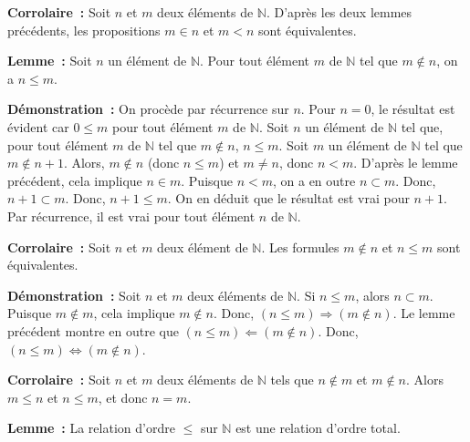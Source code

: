    \done 

\medskip

\noindent\textbf{Corrolaire :} 
    Soit $n$ et $m$ deux éléments de $\mathbb{N}$. 
    D'après les deux lemmes précédents, les propositions $m \in n$ et $m < n$ sont équivalentes.

\medskip

\noindent\textbf{Lemme :} 
    Soit $n$ un élément de $\mathbb{N}$. 
    Pour tout élément $m$ de $\mathbb{N}$ tel que $m \notin n$, on a $n \leq m$.

\medskip

\noindent\textbf{Démonstration :} 
    On procède par récurrence sur $n$. 
    Pour $n=0$, le résultat est évident car $0 \leq m$ pour tout élément $m$ de $\mathbb{N}$.
    Soit $n$ un élément de $\mathbb{N}$ tel que, pour tout élément $m$ de $\mathbb{N}$ tel que $m \notin n$, $n \leq m$. 
    Soit $m$ un élément de $\mathbb{N}$ tel que $m \notin n+1$. 
    Alors, $m \notin n$ (donc $n \leq m$) et $m \neq n$, donc $n < m$. 
    D'après le lemme précédent, cela implique $n \in m$. 
    Puisque $n < m$, on a en outre $n \subset m$. 
    Donc, $n+1 \subset m$. 
    Donc, $n+1 \leq m$. 
    On en déduit que le résultat est vrai pour $n+1$.
    Par récurrence, il est vrai pour tout élément $n$ de $\mathbb{N}$. 

   \done 

\medskip

\noindent\textbf{Corrolaire :} 
    Soit $n$ et $m$ deux élément de $\mathbb{N}$. 
    Les formules $m \notin n$ et $n \leq m$ sont équivalentes.

\medskip

\noindent\textbf{Démonstration :} 
    Soit $n$ et $m$ deux éléments de $\mathbb{N}$. 
    Si $n \leq m$, alors $n \subset m$. 
    Puisque $m \notin m$, cela implique $m \notin n$. 
    Donc, $(n \leq m) \Rightarrow (m \notin n)$.
    Le lemme précédent montre en outre que $(n \leq m) \Leftarrow (m \notin n)$.
    Donc, $(n \leq m) \Leftrightarrow (m \notin n)$.
    
   \done 

\medskip

\noindent\textbf{Corrolaire :} Soit $n$ et $m$ deux éléments de $\mathbb{N}$ tels que $n \notin m$ et $m \notin n$. 
    Alors $m \leq n$ et $n \leq m$, et donc $n = m$.

\medskip

\noindent\textbf{Lemme :} La relation d'ordre $\leq$ sur $\mathbb{N}$ est une relation d'ordre total.

